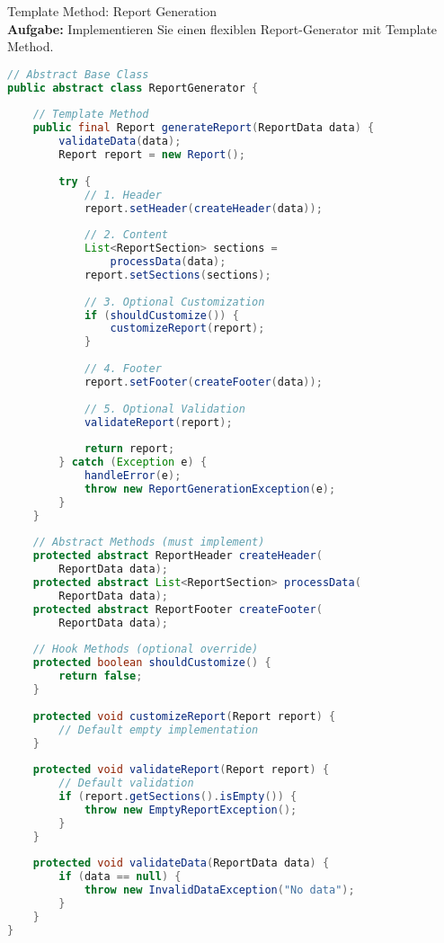 \begin{example2}[breakable]{Template Method: Report Generation}\\
\textbf{Aufgabe:} Implementieren Sie einen flexiblen Report-Generator mit Template Method.

\begin{lstlisting}[language=Java, style=basesmol]
// Abstract Base Class
public abstract class ReportGenerator {
    
    // Template Method
    public final Report generateReport(ReportData data) {
        validateData(data);
        Report report = new Report();
        
        try {
            // 1. Header
            report.setHeader(createHeader(data));
            
            // 2. Content
            List<ReportSection> sections = 
                processData(data);
            report.setSections(sections);
            
            // 3. Optional Customization
            if (shouldCustomize()) {
                customizeReport(report);
            }
            
            // 4. Footer
            report.setFooter(createFooter(data));
            
            // 5. Optional Validation
            validateReport(report);
            
            return report;
        } catch (Exception e) {
            handleError(e);
            throw new ReportGenerationException(e);
        }
    }
    
    // Abstract Methods (must implement)
    protected abstract ReportHeader createHeader(
        ReportData data);
    protected abstract List<ReportSection> processData(
        ReportData data);
    protected abstract ReportFooter createFooter(
        ReportData data);
    
    // Hook Methods (optional override)
    protected boolean shouldCustomize() {
        return false;
    }
    
    protected void customizeReport(Report report) {
        // Default empty implementation
    }
    
    protected void validateReport(Report report) {
        // Default validation
        if (report.getSections().isEmpty()) {
            throw new EmptyReportException();
        }
    }
    
    protected void validateData(ReportData data) {
        if (data == null) {
            throw new InvalidDataException("No data");
        }
    }
}


\end{lstlisting}
\end{example2}
